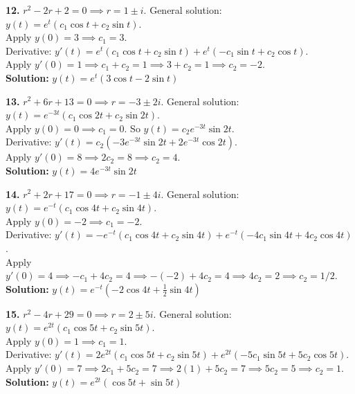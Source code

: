 \documentclass[11pt]{article}
\begin{document}
\vspace{0.5cm}
\noindent\textbf{12.} $r^2 - 2r + 2 = 0 \implies r = 1 \pm i$. General solution: $y(t) = e^t(c_1 \cos t + c_2 \sin t)$. \\
Apply $y(0) = 3 \implies c_1 = 3$. \\
Derivative: $y'(t) = e^t(c_1 \cos t + c_2 \sin t) + e^t(-c_1 \sin t + c_2 \cos t)$. \\
Apply $y'(0) = 1 \implies c_1 + c_2 = 1 \implies 3 + c_2 = 1 \implies c_2 = -2$. \\
\textbf{Solution:} $y(t) = e^t(3\cos t - 2\sin t)$

\vspace{0.5cm}
\noindent\textbf{13.} $r^2 + 6r + 13 = 0 \implies r = -3 \pm 2i$. General solution: $y(t) = e^{-3t}(c_1 \cos 2t + c_2 \sin 2t)$. \\
Apply $y(0) = 0 \implies c_1 = 0$. So $y(t) = c_2 e^{-3t} \sin 2t$. \\
Derivative: $y'(t) = c_2(-3e^{-3t}\sin 2t + 2e^{-3t}\cos 2t)$. \\
Apply $y'(0) = 8 \implies 2c_2 = 8 \implies c_2 = 4$. \\
\textbf{Solution:} $y(t) = 4e^{-3t}\sin 2t$

\vspace{0.5cm}
\noindent\textbf{14.} $r^2 + 2r + 17 = 0 \implies r = -1 \pm 4i$. General solution: $y(t) = e^{-t}(c_1 \cos 4t + c_2 \sin 4t)$. \\
Apply $y(0) = -2 \implies c_1 = -2$. \\
Derivative: $y'(t) = -e^{-t}(c_1 \cos 4t + c_2 \sin 4t) + e^{-t}(-4c_1 \sin 4t + 4c_2 \cos 4t)$. \\
Apply $y'(0) = 4 \implies -c_1 + 4c_2 = 4 \implies -(-2) + 4c_2 = 4 \implies 4c_2 = 2 \implies c_2 = 1/2$. \\
\textbf{Solution:} $y(t) = e^{-t}\left(-2\cos 4t + \frac{1}{2}\sin 4t\right)$

\vspace{0.5cm}
\noindent\textbf{15.} $r^2 - 4r + 29 = 0 \implies r = 2 \pm 5i$. General solution: $y(t) = e^{2t}(c_1 \cos 5t + c_2 \sin 5t)$. \\
Apply $y(0) = 1 \implies c_1 = 1$. \\
Derivative: $y'(t) = 2e^{2t}(c_1 \cos 5t + c_2 \sin 5t) + e^{2t}(-5c_1 \sin 5t + 5c_2 \cos 5t)$. \\
Apply $y'(0) = 7 \implies 2c_1 + 5c_2 = 7 \implies 2(1) + 5c_2 = 7 \implies 5c_2 = 5 \implies c_2 = 1$. \\
\textbf{Solution:} $y(t) = e^{2t}(\cos 5t + \sin 5t)$
\end{document}
